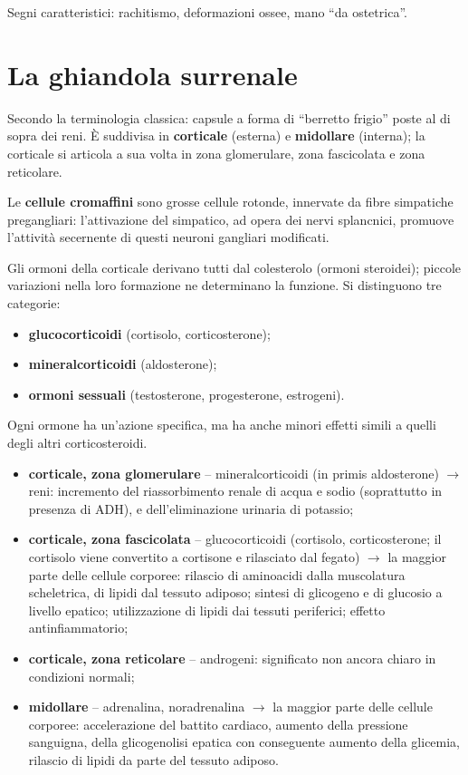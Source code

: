 Segni caratteristici: rachitismo, deformazioni ossee, mano ``da
ostetrica''.

\section{La ghiandola surrenale}

Secondo la terminologia classica: capsule a forma di ``berretto frigio''
poste al di sopra dei reni. È suddivisa in \textbf{corticale} (esterna) e
\textbf{midollare} (interna); la corticale si articola a sua volta in zona
glomerulare, zona fascicolata e zona reticolare.

Le \textbf{cellule cromaffini} sono grosse cellule rotonde, innervate da
fibre simpatiche pregangliari: l'attivazione del simpatico, ad opera dei
nervi splancnici, promuove l'attività secernente di questi neuroni
gangliari modificati.

Gli ormoni della corticale derivano tutti dal colesterolo (ormoni
steroidei); piccole variazioni nella loro formazione ne determinano la
funzione. Si distinguono tre categorie:
\begin{itemize}
  \item \textbf{glucocorticoidi} (cortisolo, corticosterone);
  \item \textbf{mineralcorticoidi} (aldosterone);
  \item \textbf{ormoni sessuali} (testosterone, progesterone, estrogeni).
\end{itemize}
Ogni ormone ha un'azione specifica, ma ha anche minori effetti simili a
quelli degli altri corticosteroidi.

\begin{itemize}
  \item \textbf{corticale, zona glomerulare} -- mineralcorticoidi (in
    primis aldosterone) $\rightarrow$ reni: incremento del riassorbimento
    renale di acqua e sodio (soprattutto in presenza di ADH), e
    dell'eliminazione urinaria di potassio;
  \item \textbf{corticale, zona fascicolata} -- glucocorticoidi (cortisolo,
    corticosterone; il cortisolo viene convertito a cortisone e rilasciato
    dal fegato) $\rightarrow$ la maggior parte delle cellule corporee:
    rilascio di aminoacidi dalla muscolatura scheletrica, di lipidi dal
    tessuto adiposo; sintesi di glicogeno e di glucosio a livello epatico;
    utilizzazione di lipidi dai tessuti periferici; effetto
    antinfiammatorio;
  \item \textbf{corticale, zona reticolare} -- androgeni: significato non
    ancora chiaro in condizioni normali;
  \item \textbf{midollare} -- adrenalina, noradrenalina $\rightarrow$ la
    maggior parte delle cellule corporee: accelerazione del battito
    cardiaco, aumento della pressione sanguigna, della glicogenolisi
    epatica con conseguente aumento della glicemia, rilascio di lipidi da
    parte del tessuto adiposo.
\end{itemize}


